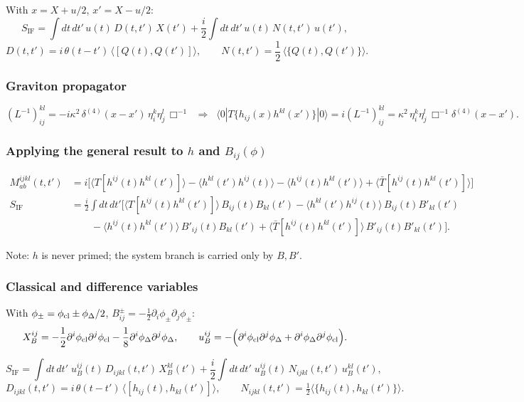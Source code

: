 \documentclass[12pt,a4paper,oneside]{article}
\numberwithin{equation}{section}   %
\begin{document}
With $x = X + u/2$, $x' = X - u/2$:
\[
S_{\mathrm{IF}}
=
\int dt\,dt'\,
u(t)\, D(t,t')\, X(t')
+
\frac{i}{2}\int dt\,dt'\,
u(t)\, N(t,t')\, u(t'),
\]
\[
D(t,t')
=
i\,\theta(t-t')\,\langle [Q(t),Q(t')]\rangle,
\qquad
N(t,t')
=
\frac{1}{2}\,\langle \{Q(t),Q(t')\}\rangle.
\]

\subsubsection{Graviton propagator}

\[
(L^{-1})_{ij}^{kl} = -i\kappa^2\,\delta^{(4)}(x-x')\,\eta_i^k\eta_j^l\,\Box^{-1}
\;\;\Longrightarrow\;\;
\langle 0|T\{h_{ij}(x)h^{kl}(x')\}|0\rangle = i(L^{-1})_{ij}^{kl} = \kappa^2\,\eta_i^k\eta_j^l\,\Box^{-1}\delta^{(4)}(x-x').
\]

\subsubsection{Applying the general result to $h$ and $B_{ij}(\phi)$}

\begin{align}
M^{ijkl}_{ab}(t,t') &= i\Big[
\langle T[h^{ij}(t)h^{kl}(t')]\rangle
-\langle h^{kl}(t')h^{ij}(t)\rangle
-\langle h^{ij}(t)h^{kl}(t')\rangle
+\langle \bar T[h^{ij}(t)h^{kl}(t')]\rangle
\Big]\\
S_{\mathrm{IF}} &= \frac{i}{2}\int dt\,dt'\Big[
\langle T[h^{ij}(t)h^{kl}(t')]\rangle\, B_{ij}(t)B_{kl}(t')
-\langle h^{kl}(t')h^{ij}(t)\rangle\, B_{ij}(t)B'_{kl}(t')\\
& \qquad -\langle h^{ij}(t)h^{kl}(t')\rangle\, B'_{ij}(t)B_{kl}(t')
+\langle \bar T[h^{ij}(t)h^{kl}(t')]\rangle\, B'_{ij}(t)B'_{kl}(t')
\Big].
\end{align}

Note: $h$ is never primed; the system branch is carried only by $B,B'$.

\subsubsection{Classical and difference variables}

With $\phi_\pm=\phi_{\rm cl}\pm\phi_\Delta/2$, $B^\pm_{ij}=-\tfrac12\partial_i\phi_\pm\partial_j\phi_\pm$:
\[
X_B^{ij} = -\frac12\partial^i\phi_{\rm cl}\partial^j\phi_{\rm cl} - \frac18\partial^i\phi_\Delta\partial^j\phi_\Delta, \qquad
u_B^{ij} = -\Big(\partial^i\phi_{\rm cl}\partial^j\phi_\Delta+\partial^i\phi_\Delta\partial^j\phi_{\rm cl}\Big).
\]

\[
S_{\mathrm{IF}}
=\int dt\,dt'\;u_B^{ij}(t)\,D_{ijkl}(t,t')\,X_B^{kl}(t')
+\frac{i}{2}\int dt\,dt'\;u_B^{ij}(t)\,N_{ijkl}(t,t')\,u_B^{kl}(t'),
\]
\[
D_{ijkl}(t,t')=i\,\theta(t-t')\,\langle[h_{ij}(t),h_{kl}(t')]\rangle,\qquad
N_{ijkl}(t,t')=\tfrac12\langle\{h_{ij}(t),h_{kl}(t')\}\rangle.
\]
\end{document}
